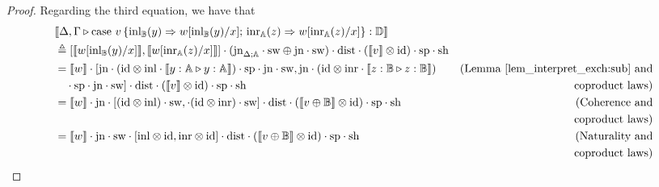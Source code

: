 \documentclass[10pt,a4paper]{amsart}
\theoremstyle{definition}
\theoremstyle{definition}
\theoremstyle{definition}
\theoremstyle{definition}
\theoremstyle{definition}
\theoremstyle{definition}
\begin{document}
\begin{proof}


Regarding the third equation, we have that
\begin{align*}
  & \llbracket \Delta,\Gamma \vljud \text{case } v\, \{\text{inl}_{\typeB} (y) \Rightarrow w [ \text{inl}_{\typeB}(y)/x] ;\, \text{inr}_{\typeA} (z) \Rightarrow w [ \text{inr}_{\typeA}(z)/x]\}: \typeD\rrbracket \\
  & \triangleq  [\llbracket  w [ \text{inl}_{\typeB}(y)/x] \rrbracket, \llbracket  w [ \text{inr}_{\typeA}(z)/x] \rrbracket] \comp (\text{jn}_{\Delta;\typeA} \comp \sw \oplus \text{jn} \comp \sw  ) \comp \dist \comp (\llbracket v\rrbracket \otimes \text{id}) \comp  \text{sp} \comp \text{sh} \\
  & = \llbracket w \rrbracket \comp [\text{jn} \comp (\text{id} \otimes\inl \comp  \llbracket y:\typeA \vljud y:\typeA  \rrbracket) \comp \text{sp} \comp \text{jn} \comp \sw , 
   \text{jn}\comp (\text{id} \otimes\inr  \comp \llbracket z:\typeB \vljud z:\typeB  \rrbracket)   & {\text{(Lemma \ref{lem_interpret_exch:sub} and}} \\
  &  \hspace{10pt}\comp \text{sp} \comp \text{jn} \comp \sw  ] \comp \dist \comp (\llbracket v\rrbracket \otimes \text{id}) \comp  \text{sp} \comp \text{sh} & {\text{coproduct laws)}}  \\
  & =  \llbracket w \rrbracket \comp \text{jn} \comp [ (\text{id} \otimes\inl)  \comp \sw  ,     \comp (\text{id} \otimes\inr) \comp \sw  ] \comp \dist  \comp (\llbracket v \oplus \typeB\rrbracket \otimes \text{id})  \comp  \text{sp} \comp \text{sh}  & {\text{(Coherence and}}   \\
  & \hspace{10pt} & {\text{coproduct laws)}}   \\
  & = \llbracket w \rrbracket \comp \text{jn} \comp   \sw \comp  [\inl \otimes \text{id} , \inr \otimes \text{id}] \comp \dist   \comp (\llbracket v \oplus \typeB\rrbracket \otimes \text{id})  \comp  \text{sp}\comp \text{sh}  & {\text{(Naturality and}}  \\
  & \hspace{10pt} & {\text{coproduct laws})}   \\

\end{align*}
\end{proof}
\end{document}
